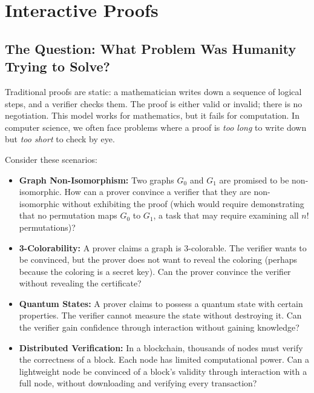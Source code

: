 
\chapter{Interactive Proofs}
\label{ch:interactive_proofs}

\section{The Question: What Problem Was Humanity Trying to Solve?}
\label{sec:ip:question}

Traditional proofs are static: a mathematician writes down a sequence of logical steps, and a verifier checks them. The proof is either valid or invalid; there is no negotiation. This model works for mathematics, but it fails for computation. In computer science, we often face problems where a proof is \emph{too long} to write down but \emph{too short} to check by eye.

Consider these scenarios:
\begin{itemize}
\item \textbf{Graph Non-Isomorphism:} Two graphs $G_0$ and $G_1$ are promised to be non-isomorphic. How can a prover convince a verifier that they are non-isomorphic without exhibiting the proof (which would require demonstrating that no permutation maps $G_0$ to $G_1$, a task that may require examining all $n!$ permutations)?

\item \textbf{3-Colorability:} A prover claims a graph is 3-colorable. The verifier wants to be convinced, but the prover does not want to reveal the coloring (perhaps because the coloring is a secret key). Can the prover convince the verifier without revealing the certificate?

\item \textbf{Quantum States:} A prover claims to possess a quantum state with certain properties. The verifier cannot measure the state without destroying it. Can the verifier gain confidence through interaction without gaining knowledge?

\item \textbf{Distributed Verification:} In a blockchain, thousands of nodes must verify the correctness of a block. Each node has limited computational power. Can a lightweight node be convinced of a block's validity through interaction with a full node, without downloading and verifying every transaction?
\end{itemize}

